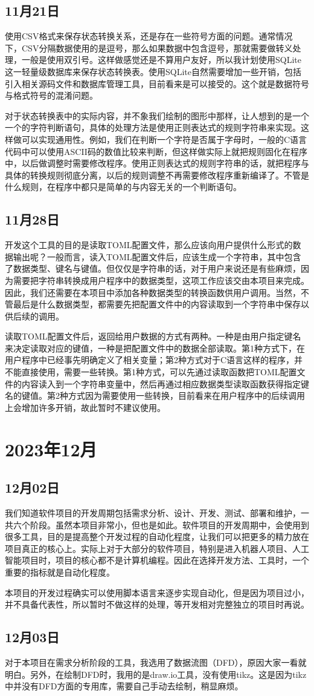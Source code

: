 \subsection{11月21日}
使用CSV格式来保存状态转换关系，还是存在一些符号方面的问题。通常情况下，CSV分隔数据使用的是逗号，那么如果数据中包含逗号，那就需要做转义处理，一般是使用双引号。这样做感觉还是不算用户友好，所以我计划使用SQLite这一轻量级数据库来保存状态转换表。使用SQLite自然需要增加一些开销，包括引入相关源码文件和数据库管理工具，目前看来是可以接受的。这个就是数据符号与格式符号的混淆问题。

对于状态转换表中的实际内容，并不象我们绘制的图形中那样，让人想到的是一个一个的字符判断语句，具体的处理方法是使用正则表达式的规则字符串来实现。这样做可以实现通用性。例如，我们在判断一个字符是否属于字母时，一般的C语言代码中可以使用ASCII码的数值比较来判断，但这样做实际上就把规则固化在程序中，以后做调整时需要修改程序。使用正则表达式的规则字符串的话，就把程序与具体的转换规则彻底分离，以后的规则调整不再需要修改程序重新编译了。不管是什么规则，在程序中都只是简单的与内容无关的一个判断语句。


\subsection{11月28日}
开发这个工具的目的是读取TOML配置文件，那么应该向用户提供什么形式的数据输出呢？一般而言，读入TOML配置文件后，应该生成一个字符串，其中包含了数据类型、键名与键值。但仅仅是字符串的话，对于用户来说还是有些麻烦，因为需要把字符串转换成用户程序中的数据类型，这项工作应该交由本项目来完成。因此，我们还需要在本项目中添加各种数据类型的转换函数供用户调用。当然，不管最后是什么数据类型，都需要先把配置文件中的内容读取到一个字符串中保存以供后续的调用。

读取TOML配置文件后，返回给用户数据的方式有两种。一种是由用户指定键名来决定读取对应的键值，一种是把配置文件中的数据全部读取。第1种方式下，在用户程序中已经事先明确定义了相关变量；第2种方式对于C语言这样的程序，并不能直接使用，需要一些转换。第1种方式，可以先通过读取函数把TOML配置文件的内容读入到一个字符串变量中，然后再通过相应数据类型读取函数获得指定键名的键值。第2种方式因为需要使用一些转换，目前看来在用户程序中的后续调用上会增加许多开销，故此暂时不建议使用。


\section{2023年12月}


\subsection{12月02日}
我们知道软件项目的开发周期包括需求分析、设计、开发、测试、部署和维护，一共六个阶段。虽然本项目非常小，但也是如此。软件项目的开发周期中，会使用到很多工具，目的是提高整个开发过程的自动化程度，让我们可以把更多的精力放在项目真正的核心上。实际上对于大部分的软件项目，特别是进入机器人项目、人工智能项目时，项目的核心都不是计算机编程。因此在选择开发方法、工具时，一个重要的指标就是自动化程度。

本项目的开发过程确实可以使用脚本语言来逐步实现自动化，但是因为项目过小，并不具备代表性，所以暂时不做这样的处理，等开发相对完整独立的项目时再说。


\subsection{12月03日}
对于本项目在需求分析阶段的工具，我选用了数据流图（DFD），原因大家一看就明白。另外，在绘制DFD时，我用的是draw.io工具，没有使用tikz。这是因为tikz中并没有DFD方面的专用库，需要自己手动去绘制，稍显麻烦。